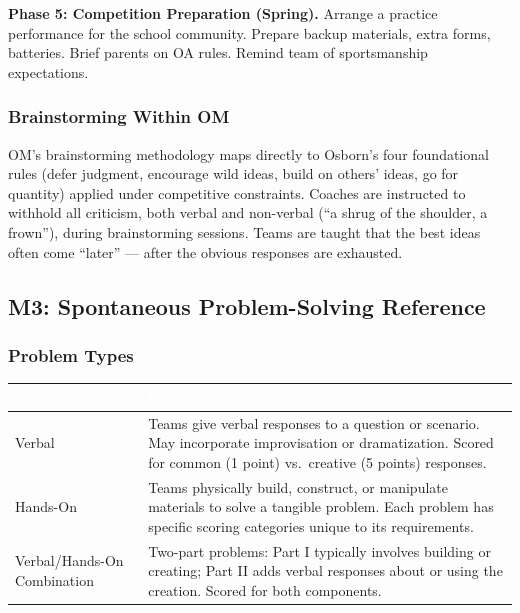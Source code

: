 \documentclass[11pt,letterpaper]{article}
\newcommand{\tableheader}[1]{\textbf{\sffamily\textcolor{white}{#1}}}
\begin{document}
\textbf{Phase 5: Competition Preparation (Spring).} Arrange a practice performance for the school community. Prepare backup materials, extra forms, batteries. Brief parents on OA rules. Remind team of sportsmanship expectations.

\subsubsection{Brainstorming Within OM}

OM's brainstorming methodology maps directly to Osborn's four foundational rules (defer judgment, encourage wild ideas, build on others' ideas, go for quantity) applied under competitive constraints. Coaches are instructed to withhold all criticism, both verbal and non-verbal (``a shrug of the shoulder, a frown''), during brainstorming sessions. Teams are taught that the best ideas often come ``later'' --- after the obvious responses are exhausted.

\subsection{M3: Spontaneous Problem-Solving Reference}

\subsubsection{Problem Types}

\begin{center}
\begin{tabularx}{\textwidth}{L{3cm}X}
\toprule
{}
\tableheader{Type} & \tableheader{Description} \\
\midrule
Verbal & Teams give verbal responses to a question or scenario. May incorporate improvisation or dramatization. Scored for common (1 point) vs.\ creative (5 points) responses. \\
Hands-On & Teams physically build, construct, or manipulate materials to solve a tangible problem. Each problem has specific scoring categories unique to its requirements. \\
Verbal/Hands-On Combination & Two-part problems: Part I typically involves building or creating; Part II adds verbal responses about or using the creation. Scored for both components. \\
\bottomrule
\end{tabularx}
\end{center}
\end{document}

